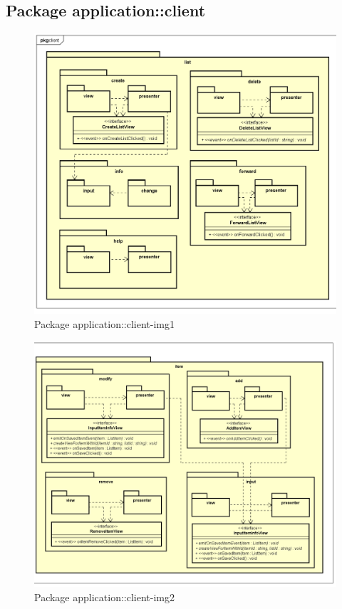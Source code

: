 \subsection{Package application::client}
\label{Package application::client}
\begin{figure}[H]
	\centering
	\includegraphics[width=\textwidth]{Sezioni/Packages/App/pck_client1.png}
	\caption{Package application::client-img1}
\end{figure}

\label{Package application::client}
\begin{figure}[H]
	\centering
	\includegraphics[width=\textwidth]{Sezioni/Packages/App/pck_client2.png}
	\caption{Package application::client-img2}
\end{figure}

